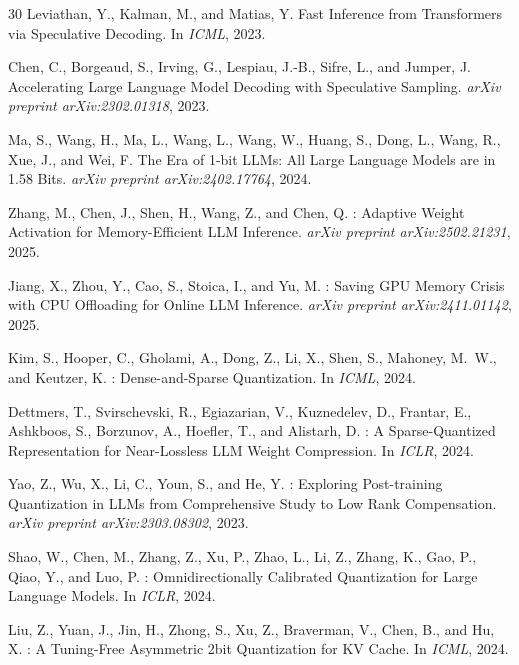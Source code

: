 \documentclass{article}
\begin{document}
\begin{thebibliography}{30}
Leviathan, Y., Kalman, M., and Matias, Y.
\newblock Fast Inference from Transformers via Speculative Decoding.
\newblock In \emph{ICML}, 2023.

Chen, C., Borgeaud, S., Irving, G., Lespiau, J.-B., Sifre, L., and Jumper, J.
\newblock Accelerating Large Language Model Decoding with Speculative Sampling.
\newblock \emph{arXiv preprint arXiv:2302.01318}, 2023.

Ma, S., Wang, H., Ma, L., Wang, L., Wang, W., Huang, S., Dong, L., Wang, R., Xue, J., and Wei, F.
\newblock The Era of 1-bit {LLM}s: All Large Language Models are in 1.58 Bits.
\newblock \emph{arXiv preprint arXiv:2402.17764}, 2024.

Zhang, M., Chen, J., Shen, H., Wang, Z., and Chen, Q.
: Adaptive Weight Activation for Memory-Efficient {LLM} Inference.
\newblock \emph{arXiv preprint arXiv:2502.21231}, 2025.

Jiang, X., Zhou, Y., Cao, S., Stoica, I., and Yu, M.
: Saving {GPU} Memory Crisis with {CPU} Offloading for Online {LLM} Inference.
\newblock \emph{arXiv preprint arXiv:2411.01142}, 2025.

Kim, S., Hooper, C., Gholami, A., Dong, Z., Li, X., Shen, S., Mahoney, M.~W., and Keutzer, K.
: Dense-and-Sparse Quantization.
\newblock In \emph{ICML}, 2024.

Dettmers, T., Svirschevski, R., Egiazarian, V., Kuznedelev, D., Frantar, E., Ashkboos, S., Borzunov, A., Hoefler, T., and Alistarh, D.
: A Sparse-Quantized Representation for Near-Lossless {LLM} Weight Compression.
\newblock In \emph{ICLR}, 2024.

Yao, Z., Wu, X., Li, C., Youn, S., and He, Y.
: Exploring Post-training Quantization in {LLMs} from Comprehensive Study to Low Rank Compensation.
\newblock \emph{arXiv preprint arXiv:2303.08302}, 2023.

Shao, W., Chen, M., Zhang, Z., Xu, P., Zhao, L., Li, Z., Zhang, K., Gao, P., Qiao, Y., and Luo, P.
: Omnidirectionally Calibrated Quantization for Large Language Models.
\newblock In \emph{ICLR}, 2024.

Liu, Z., Yuan, J., Jin, H., Zhong, S., Xu, Z., Braverman, V., Chen, B., and Hu, X.
: A Tuning-Free Asymmetric 2bit Quantization for {KV} Cache.
\newblock In \emph{ICML}, 2024.

\end{thebibliography}
\end{document}
